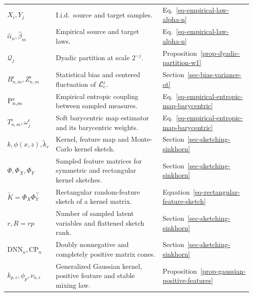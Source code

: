 {\begin{longtable}{>{\raggedright\arraybackslash}p{}
                  >{\raggedright\arraybackslash}p{}
                  >{\raggedright\arraybackslash}p{}}
\hline
\multicolumn{3}{l}{\textbf{Statistical OT, empirical maps and kernel sketching}}\\
\hline
$X_i,Y_j$ & I.i.d.\ source and target samples. & Eq.~\eqref{eq-empirical-law-alpha-n} \\
$\hat\alpha_n,\hat\beta_m$ & Empirical source and target laws. & Eq.~\eqref{eq-empirical-law-alpha-n} \\
$\mathcal Q_j$ & Dyadic partition at scale $2^{-j}$. & Proposition~\ref{prop-dyadic-partition-w1} \\
$B_{n,m}^\epsilon,Z_{n,m}^\epsilon$ & Statistical bias and centered fluctuation of $\MK_c^\epsilon$. & Section~\ref{sec-bias-variance-ot} \\
$\P_{n,m}^{\epsilon}$ & Empirical entropic coupling between sampled measures. & Eq.~\eqref{eq-empirical-entropic-map-barycentric} \\
$T_{n,m}^{\epsilon},\omega_j^\epsilon$ & Soft barycentric map estimator and its barycentric weights. & Eq.~\eqref{eq-empirical-entropic-map-barycentric} \\
$k,\phi(x,z),\widetilde k_r$ & Kernel, feature map and Monte-Carlo kernel sketch. & Section~\ref{sec-sketching-sinkhorn} \\
$\Phi,\Phi_X,\Phi_Y$ & Sampled feature matrices for symmetric and rectangular kernel sketches. & Section~\ref{sec-sketching-sinkhorn} \\
$\widetilde K=\Phi_X\Phi_Y^\top$ & Rectangular random-feature sketch of a kernel matrix. & Equation~\eqref{eq-rectangular-feature-sketch} \\
$r,R=rp$ & Number of sampled latent variables and flattened sketch rank. & Section~\ref{sec-sketching-sinkhorn} \\
$\mathrm{DNN}_n,\mathrm{CP}_n$ & Doubly nonnegative and completely positive matrix cones. & Section~\ref{sec-sketching-sinkhorn} \\
$k_{p,\epsilon},\phi_p,\nu_{a,\epsilon}$ & Generalized Gaussian kernel, positive feature and stable mixing law. & Proposition~\ref{prop-gaussian-positive-features} \\


\end{longtable}}
